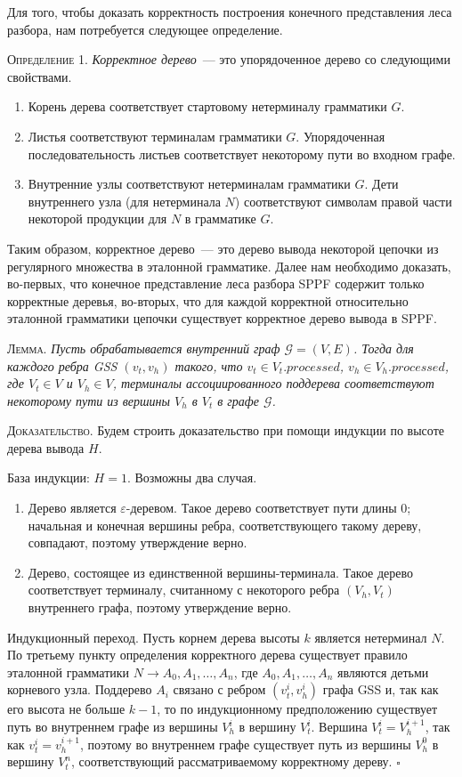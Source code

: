 Для того, чтобы доказать корректность построения конечного представления леса разбора, нам потребуется следующее определение. 

\textsc{Определение 1.} 
\emph{Корректное дерево}~--- это упорядоченное дерево со следующими свойствами.
\begin{enumerate}
  \item Корень дерева соответствует стартовому нетерминалу грамматики $G$.
  \item Листья соответствуют терминалам грамматики $G$. Упорядоченная последовательность листьев соответствует некоторому пути во входном графе.
  \item Внутренние узлы соответствуют нетерминалам грамматики $G$. Дети внутреннего узла (для нетерминала $N$) соответствуют символам правой части некоторой продукции для $N$ в грамматике $G$.
\end{enumerate}

Таким образом, корректное дерево~--- это дерево вывода некоторой цепочки из регулярного множества в эталонной грамматике. Далее нам необходимо доказать, во-первых, что конечное представление леса разбора SPPF содержит только корректные деревья, во-вторых, что для каждой корректной относительно эталонной грамматики цепочки существует корректное дерево вывода в SPPF. 

\textsc{Лемма.}
\textit{Пусть обрабатывается внутренний граф $\mathcal{G}=(V,E)$. Тогда для каждого ребра GSS $(v_{t}, v_{h})$ такого, что $v_{t} \in V_{t}.processed$, $v_{h} \in V_{h}.processed$, где $V_{t} \in V$ и $V_{h} \in V$, терминалы ассоциированного поддерева соответствуют некоторому пути из вершины $V_{h}$ в $V_{t}$ в графе $\mathcal{G}$.}

\textsc{Доказательство.}
Будем строить доказательство при помощи индукции по высоте дерева вывода $H$. 

База индукции: $H=1$. Возможны два случая.
\begin{enumerate}
  \item Дерево является $\varepsilon$-деревом. Такое дерево соответствует пути длины $0$; начальная и конечная вершины ребра, соответствующего такому дереву, совпадают, поэтому утверждение верно.
  \item Дерево, состоящее из единственной вершины-терминала. Такое дерево соответствует терминалу, считанному с некоторого ребра $(V_{h}, V_{t})$ внутреннего графа, поэтому утверждение верно. 
\end{enumerate}  

Индукционный переход. Пусть корнем дерева высоты $k$ является нетерминал $N$. По третьему пункту определения корректного дерева существует правило эталонной грамматики $N \rightarrow A_{0}, A_{1}, \dots, A_{n}$, где $A_{0}, A_{1}, \dots, A_{n}$ являются детьми корневого узла. Поддерево $A_{i}$ связано с ребром $(v_{t}^{i}, v_{h}^{i})$ графа GSS и, так как его высота не больше $k-1$, то по индукционному предположению существует путь во внутреннем графе из вершины $V_{h}^{i}$ в вершину $V_{t}^{i}$. Вершина $V_{t}^{i} = V_{h}^{i+1}$, так как $v_{t}^{i} = v_{h}^{i+1}$, поэтому во внутреннем графе существует путь из вершины $V_{h}^{0}$ в вершину $V_{t}^{n}$, соответствующий рассматриваемому корректному дереву. $\square$

